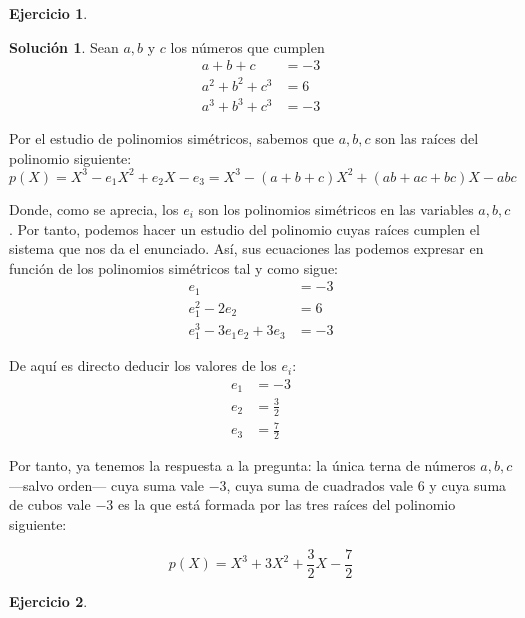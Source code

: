 \documentclass[a4paper, 11pt]{article}
\theoremstyle{definition}
\newtheorem{ejercicio}{Ejercicio}
\newtheorem*{solucion}{Solución}
\theoremstyle{remark}
\begin{document}
  \begin{ejercicio}
  \end{ejercicio}

  \begin{solucion}
      Sean $a,b$ y $c$ los números que cumplen
      \begin{align*}
          a+b+c &= -3 \\
          a^2+b^2+c^3 &= 6 \\
          a^3+b^3+c^3 &= -3
      \end{align*}

      Por el estudio de polinomios simétricos, sabemos que $a,b,c$ son las raíces del polinomio siguiente:
      \[
      p(X) = X^3 -e_1 X^2 + e_2 X - e_3 = X^3 - (a+b+c) X^2 + (ab+ac+bc) X - abc
      \]

      Donde, como se aprecia, los $e_i$ son los polinomios simétricos en las variables $a,b,c$. Por tanto, podemos hacer un estudio del polinomio cuyas raíces cumplen el sistema que nos da el enunciado. Así, sus ecuaciones las podemos expresar en función de los polinomios simétricos tal y como sigue:
      \begin{align*}
          e_1 &= -3 \\
          e_1^2-2e_2 &= 6 \\
          e_1^3 -3e_1e_2 +3e_3 &= -3
      \end{align*}

      De aquí es directo deducir los valores de los $e_i$:
      \begin{align*}
          e_1 &= -3 \\
          e_2 &= \frac{3}{2} \\
          e_3 &= \frac{7}{2}
      \end{align*}

      Por tanto, ya tenemos la respuesta a la pregunta: la única terna de números $a,b,c$ ---salvo orden--- cuya suma vale $-3$, cuya suma de cuadrados vale $6$ y cuya suma de cubos vale $-3$ es la que está formada por las tres raíces del polinomio siguiente:

      \[
      \boxed{p(X) = X^3 +3X^2 + \frac{3}{2}X - \frac{7}{2}}
      \]
  \end{solucion}

  \begin{ejercicio}
  \end{ejercicio}
\end{document}
